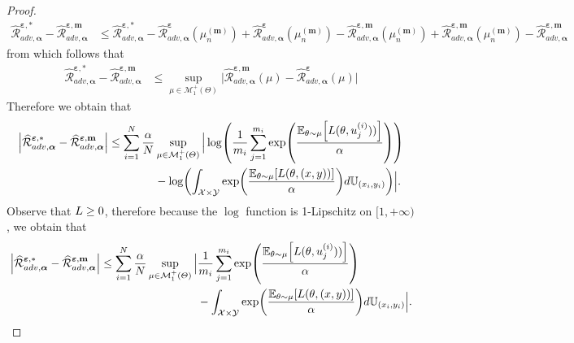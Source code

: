 \begin{proof}
\begin{align*}
\widehat{\mathcal{R}}^{\bm{\varepsilon},*}_{adv,\bm{\alpha}} - \widehat{\mathcal{R}}^{\bm{\varepsilon},\textbf{m}}_{adv,\bm{\alpha}}&\leq \widehat{\mathcal{R}}^{\bm{\varepsilon},*}_{adv,\bm{\alpha}} -
\widehat{\mathcal{R}}^{\bm{\varepsilon}}_{adv,\bm{\alpha}}(\mu_n^{(\bm{m})})
+\widehat{\mathcal{R}}^{\bm{\varepsilon}}_{adv,\bm{\alpha}}(\mu_n^{(\bm{m})}) - \widehat{\mathcal{R}}^{\bm{\varepsilon},\textbf{m}}_{adv,\bm{\alpha}}(\mu_n^{(\bm{m})}) + \widehat{\mathcal{R}}^{\bm{\varepsilon},\textbf{m}}_{adv,\bm{\alpha}}(\mu_n^{(\bm{m})}) - \widehat{\mathcal{R}}^{\bm{\varepsilon},\textbf{m}}_{adv,\bm{\alpha}}
\end{align*}
from which follows that 
\begin{align*}
\widehat{\mathcal{R}}^{\bm{\varepsilon},*}_{adv,\bm{\alpha}} - \widehat{\mathcal{R}}^{\bm{\varepsilon},\textbf{m}}_{adv,\bm{\alpha}}&\leq  \sup_{\mu\in \mathcal{M}^+_1(\Theta)}\Big|\widehat{\mathcal{R}}^{\bm{\varepsilon},\textbf{m}}_{adv,\bm{\alpha}}(\mu) - \widehat{\mathcal{R}}^{\bm{\varepsilon}}_{adv,\bm{\alpha}}(\mu) \Big| 
\end{align*}
Therefore we obtain that 
\begin{align*}
\Big| \widehat{\mathcal{R}}^{\bm{\varepsilon},*}_{adv,\bm{\alpha}} - \widehat{\mathcal{R}}^{\bm{\varepsilon},\textbf{m}}_{adv,\bm{\alpha}}\Big |\leq 
\sum_{i=1}^\numsamples\frac{\alpha}{\numsamples}  &\sup_{\mu\in \mathcal{M}^+_1(\Theta)}\Big|\log\left(\frac{1}{m_i}\sum_{j=1}^{m_i}\exp\left(\frac{\mathbb{E}_{\theta \sim \mu}\left[\loss(\theta,u_j^{(i)}))\right]}{\alpha}\right)\right)\\
    &- \log\left(\int_{\mathcal{X}\times\mathcal{Y}}\exp\left(\frac{\mathbb{E}_{\theta \sim \mu}\left[\loss(\theta,(x,y))\right]}{\alpha}\right) d\mathbb{U}_{(x_i,y_i)} \right)\Big|.
\end{align*}
Observe that $L\geq 0$, therefore because the $\log$ function is 1-Lipschitz on $[1,+\infty)$, we obtain that 
\begin{align*}
\Big| \widehat{\mathcal{R}}^{\bm{\varepsilon},*}_{adv,\bm{\alpha}} - \widehat{\mathcal{R}}^{\bm{\varepsilon},\textbf{m}}_{adv,\bm{\alpha}}\Big |
\leq 
\sum_{i=1}^\numsamples\frac{\alpha}{\numsamples}  \sup_{\mu\in \mathcal{M}^+_1(\Theta)}\Big | &\frac{1}{m_i}\sum_{j=1}^{m_i}\exp\left(\frac{\mathbb{E}_{\theta \sim \mu}\left[\loss(\theta,u_j^{(i)}))\right]}{\alpha}\right)\\
    &- \int_{\mathcal{X}\times\mathcal{Y}}\exp\left(\frac{\mathbb{E}_{\theta \sim \mu}\left[\loss(\theta,(x,y))\right]}{\alpha}\right) d\mathbb{U}_{(x_i,y_i)} \Big|.

\end{align*}
\end{proof}
